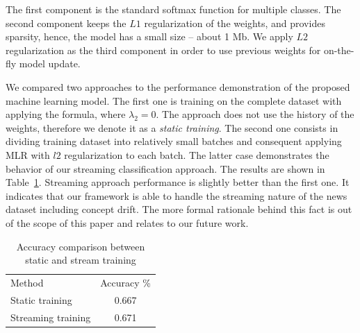The first component is the standard softmax function for multiple classes. The second component keeps the $L1$ regularization of the weights, and provides sparsity, hence, the model has a small size -- about 1 Mb. We apply $L2$ regularization as the third component in order to use previous weights for on-the-fly model update.

We compared two approaches to the performance demonstration of the proposed machine learning model. The first one is training on the complete dataset with applying the formula, where $\lambda_2 = 0$. The approach does not use the history of the weights, therefore we denote it as a {\em static training}. The second one consists in dividing training dataset into relatively small batches and consequent applying MLR with $l2$ regularization to each batch. The latter case demonstrates the behavior of our streaming classification approach. The results are shown in Table~\ref{accuracy}. Streaming approach performance is slightly better than the first one. It indicates that our framework is able to handle the streaming nature of the news dataset including concept drift. The more formal rationale behind this fact is out of the scope of this paper and relates to our future work.

\begin{table}[htbp]
\begin{tabular}{lc}
Method             & Accuracy \% \\
Static training    & 0.667       \\
Streaming training & 0.671         
\end{tabular}
\caption{Accuracy comparison between static and stream training}
\label{accuracy}
\vspace{-7mm}
\end{table}